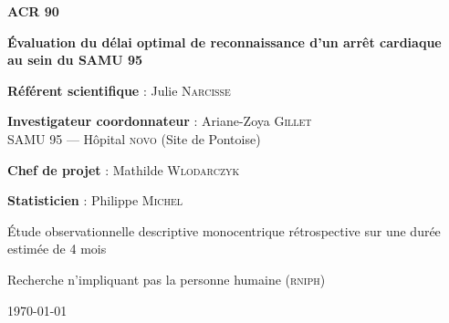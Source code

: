%
\raggedright
\thispagestyle{empty}

\begin{tcolorbox}[colback=novo!5,
                  colframe=novo]
\begin{center}
\textbf{\textcolor{novo}{\Huge ACR 90}}
\end{center}
\end{tcolorbox}


\bigskip
\begin{center}
\textbf{\Large Évaluation du délai optimal de reconnaissance d’un arrêt cardiaque\\ au sein du SAMU 95}
\end{center}


\begin{center}
\begin{minipage}{0.8\textwidth}
\begin{tcolorbox}[colback=novo!5,
                  colframe=novo]

\textbf{Référent scientifique} : \doc Julie  \textsc{Narcisse}
\bigskip

\textbf{Investigateur coordonnateur} : \doc Ariane-Zoya  \textsc{Gillet}\\
SAMU 95  --- Hôpital \textsc{novo} (Site de Pontoise)

\bigskip

\bigskip

\textbf{Chef de projet} : \mme Mathilde  \textsc{Wlodarczyk}

\bigskip



\textbf{Statisticien} : \doc Philippe \textsc{Michel}

\end{tcolorbox}
\end{minipage}
\end{center}


Étude observationnelle descriptive monocentrique rétrospective sur une durée
estimée de 4 mois

Recherche n’impliquant pas la personne humaine (\textsc{rniph})


\begin{flushright}
\today
\end{flushright}
